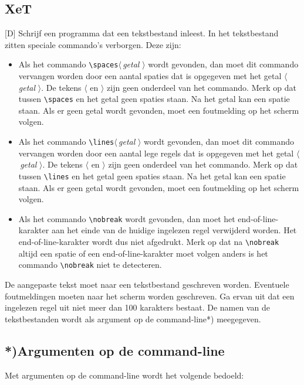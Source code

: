 \documentclass[a4paper,10pt,fleqn,twoside]{article}
\begin{document}
\subsection{XeT}[D]
Schrijf een programma dat een tekstbestand inleest. In het tekstbestand zitten speciale commando's verborgen. Deze zijn:

\begin{itemize}
\item Als het commando \lstinline|\spaces|$\langle$\,\textsl{getal} $\rangle$ wordt gevonden, dan moet dit commando vervangen worden door een aantal spaties dat is opgegeven met het getal $\langle$\,\textsl{getal} $\rangle$. De tekens $\langle$ en $\rangle$ zijn geen onderdeel van het commando. Merk op dat tussen \lstinline|\spaces| en het getal geen spaties staan. Na het getal kan een spatie staan. Als er geen getal wordt gevonden, moet een foutmelding op het scherm volgen.
\item Als het commando \lstinline|\lines|$\langle$\,\textsl{getal} $\rangle$ wordt gevonden, dan moet dit commando vervangen worden door een aantal lege regels dat is opgegeven met het getal $\langle$\,\textsl{getal} $\rangle$. De tekens $\langle$ en $\rangle$ zijn geen onderdeel van het commando. Merk op dat tussen \lstinline|\lines| en het getal geen spaties staan. Na het getal kan een spatie staan.  Als er geen getal wordt gevonden, moet een foutmelding op het scherm volgen.
\item Als het commando \lstinline|\nobreak| wordt gevonden, dan moet het end-of-line-karakter aan het einde van de huidige ingelezen regel verwijderd worden. Het end-of-line-karakter wordt dus niet afgedrukt. Merk op dat na \lstinline|\nobreak| altijd een spatie of een end-of-line-karakter moet volgen anders is het commando \lstinline|\nobreak| niet te detecteren.
\end{itemize}

De aangepaste tekst moet naar een tekstbestand geschreven worden. Eventuele foutmeldingen moeten naar het scherm worden geschreven. Ga ervan uit dat een ingelezen regel uit niet meer dan 100 karakters bestaat. De namen van de tekstbestanden wordt als argument op de command-line*) meegegeven.

\subsection{*)\space\space Argumenten op de command-line}
Met argumenten op de command-line wordt het volgende bedoeld:
\end{document}
